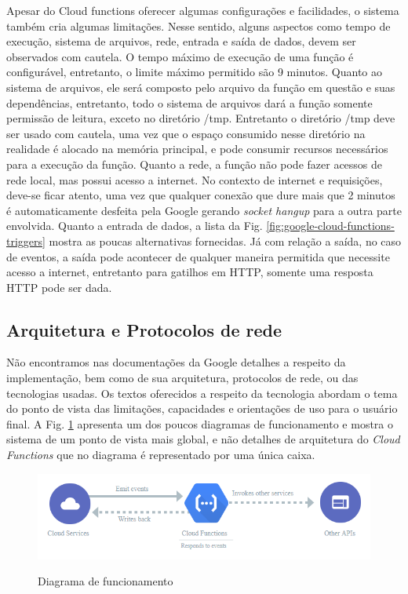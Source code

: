 Apesar do Cloud functions oferecer algumas configurações e facilidades, o sistema também cria algumas limitações. Nesse sentido, alguns aspectos como tempo de execução, sistema de arquivos, rede, entrada e saída de dados, devem ser observados com cautela. O tempo máximo de execução de uma função é configurável, entretanto, o limite máximo permitido são 9 minutos. Quanto ao sistema de arquivos, ele será composto pelo arquivo da função em questão e suas dependências, entretanto, todo o sistema de arquivos dará a função somente permissão de leitura, exceto no diretório /tmp. Entretanto o diretório /tmp deve ser usado com cautela, uma vez que o espaço consumido nesse diretório na realidade é alocado na memória principal, e pode consumir recursos necessários para a execução da função. Quanto a rede, a função não pode fazer acessos de rede local, mas possui acesso a internet. No contexto de internet e requisições, deve-se ficar atento, uma vez que qualquer conexão que dure mais que 2 minutos é automaticamente desfeita pela Google gerando \textit{socket hangup} para a outra parte envolvida. Quanto a entrada de dados, a lista da Fig. \ref{fig:google-cloud-functions-triggers} mostra as poucas alternativas fornecidas. Já com relação a saída, no caso de eventos, a saída pode acontecer de qualquer maneira permitida que necessite acesso a internet, entretanto para gatilhos em HTTP, somente uma resposta HTTP pode ser dada.

\subsection{Arquitetura e Protocolos de rede}
Não encontramos nas documentações da Google detalhes a respeito da implementação, bem como de sua arquitetura, protocolos de rede, ou das tecnologias usadas. Os textos oferecidos a respeito da tecnologia abordam o tema do ponto de vista das limitações, capacidades e orientações de uso para o usuário final. A Fig. \ref{fig:google-cloud-functions-workflow} apresenta um dos poucos diagramas de funcionamento e mostra o sistema de um ponto de vista mais global, e não detalhes de arquitetura do \textit{Cloud Functions} que no diagrama é representado por uma única caixa.

\begin{figure}[ht]
	\centering
	\caption{Diagrama de funcionamento}

	\includegraphics[width=12.5cm]{figuras/google-cloud-functions/workflow.png}
	\label{fig:google-cloud-functions-workflow}
\end{figure}

